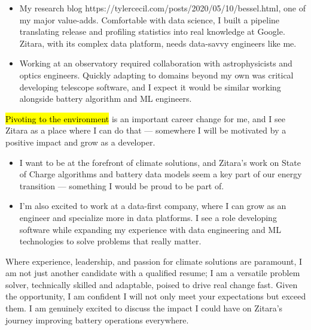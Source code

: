 \documentclass{tc_cv}
\begin{document}
\begin{adjustwidth}{38pt}{38pt}
\begin{itemize}
    \item My research blog \cite{dives into
      statistics}{https://tylercecil.com/posts/2020/05/10/bessel.html}, one of
      my major value-adds. Comfortable with data science, I built a pipeline
      translating release and profiling statistics into real knowledge at
      Google. Zitara, with its complex data platform, needs data-savvy
      engineers like me.

    \item Working at an observatory required collaboration with astrophysicists
      and optics engineers. Quickly adapting to domains beyond my own was
      critical developing telescope software, and I expect it would be similar
      working alongside battery algorithm and ML engineers.

  \end{itemize} \medskip

  \hl{Pivoting to the environment} is an important career change for me,
  and I see Zitara as a place where I can do that --- somewhere I will be
  motivated by a positive impact and grow as a developer.
  \begin{itemize}


    \item I want to be at the forefront of climate solutions, and Zitara's work
      on State of Charge algorithms and battery data models seem a key part of
      our energy transition --- something I would be proud to be part of.

    \item I'm also excited to work at a data-first company, where I can grow as
      an engineer and specialize more in data platforms. I see a role
      developing software while expanding my experience with data engineering
      and ML technologies to solve problems that really matter.

  \end{itemize} \medskip

  Where experience, leadership, and passion for climate solutions are
  paramount, I am not just another candidate with a qualified resume; I am a
  versatile problem solver, technically skilled and adaptable, poised to drive
  real change fast. Given the opportunity, I am confident I will not only meet
  your expectations but exceed them. I am genuinely excited to discuss the
  impact I could have on Zitara's journey improving battery operations
  everywhere.


\end{adjustwidth}
\end{document}
